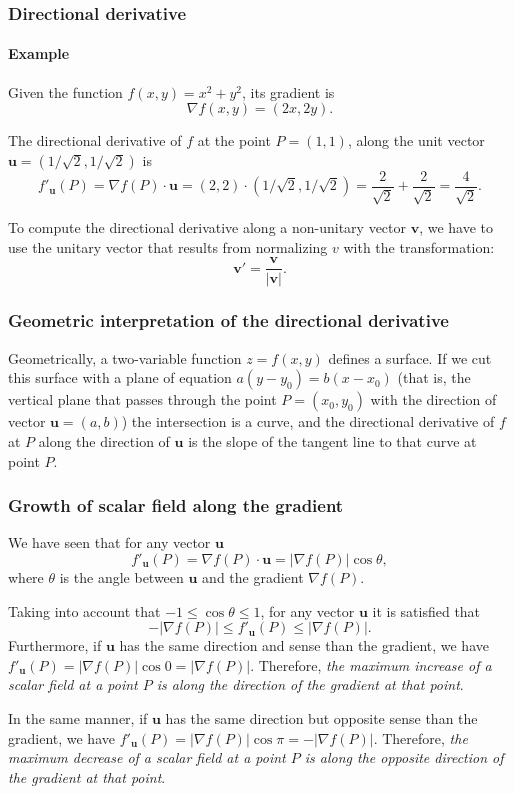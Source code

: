 \begin{frame}
\frametitle{Directional derivative}
\framesubtitle{Example}
Given the function $f(x,y) = x^2+y^2$, its gradient is
\[
\nabla f(x,y) = (2x,2y).
\]

The directional derivative of $f$ at the point $P=(1,1)$, along the unit vector $\mathbf{u}=(1/\sqrt{2},1/\sqrt{2})$ is
\[
f'_{\mathbf{u}}(P) = \nabla f(P)\cdot \mathbf{u} = (2,2)\cdot(1/\sqrt{2},1/\sqrt{2}) = \frac{2}{\sqrt{2}}+\frac{2}{\sqrt{2}} = \frac{4}{\sqrt{2}}.
\]

To compute the directional derivative along a non-unitary vector $\mathbf{v}$, we have to use the unitary vector that results from normalizing $v$ with the transformation:
\[
\mathbf{v'}=\frac{\mathbf{v}}{|\mathbf{v}|}.
\]
\end{frame}


\begin{frame}
\frametitle{Geometric interpretation of the directional derivative}
Geometrically, a two-variable function $z=f(x,y)$ defines a surface.
If we cut this surface with a plane of equation $a(y-y_0)=b(x-x_0)$ (that is, the vertical plane that passes through the point $P=(x_0,y_0)$ with the direction of vector $\mathbf{u}=(a,b)$)
the intersection is a curve, and the directional derivative of $f$ at $P$ along the direction of $\mathbf{u}$ is the slope of the tangent line to that curve at point $P$.

\begin{center}
\end{center}
\end{frame}


\begin{frame}
\frametitle{Growth of scalar field along the gradient}
We have seen that for any vector $\mathbf{u}$
\[
f'_{\mathbf{u}}(P) = \nabla f(P)\cdot \mathbf{u} = |\nabla f(P)|\cos \theta,
\]
where $\theta$ is the angle between $\mathbf{u}$ and the gradient $\nabla f(P)$.

Taking into account that $-1\leq \cos\theta\leq 1$, for any vector $\mathbf{u}$ it is satisfied that
\[
-|\nabla f(P)|\leq f'_{\mathbf{u}}(P)\leq |\nabla f(P)|.
\]
Furthermore, if $\mathbf{u}$ has the same direction and sense than the gradient, we have $f'_{\mathbf{u}}(P)=|\nabla f(P)|\cos 0=|\nabla f(P)|$.
Therefore, \alert{\emph{the maximum increase of a scalar field at a point $P$ is along the direction of the gradient at that point}}.

In the same manner, if $\mathbf{u}$ has the same direction but opposite sense than the gradient, we have $f'_{\mathbf{u}}(P)=|\nabla f(P)|\cos \pi=-|\nabla f(P)|$.
Therefore, \alert{\emph{the maximum decrease of a scalar field at a point $P$ is along the opposite direction of the gradient at that point}}.
\end{frame}


